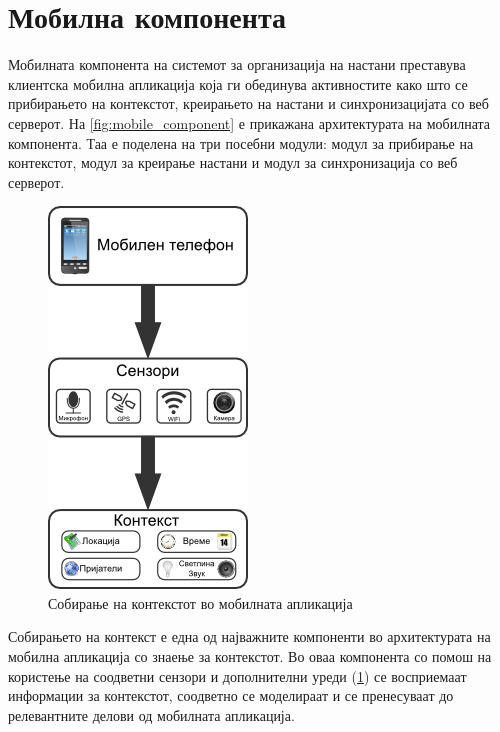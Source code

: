 \section{Мобилна компонента}

Мобилната компонента на системот за организација на настани преставува клиентска
мобилна апликација која ги обединува активностите како што се прибирањето на
контекстот, креирањето на настани и синхронизацијата со веб серверот. На
\ref{fig:mobile_component} е прикажана архитектурата на мобилната компонента.
Таа е поделена на три посебни модули: модул за прибирање на контекстот, модул за
креирање настани и модул за синхронизација со веб серверот.

\begin{figure}[htb]
\centering
\includegraphics[scale=0.4]{images/context_aquisition}
\caption{Собирање на контекстот во мобилната апликација}
\label{fig:context_aquisition}
\end{figure}

 
Собирањето на контекст е една од најважните компоненти во архитектурата на
мобилна апликација со знаење за контекстот. Во оваа компонента со помош на
користење на соодветни сензори и дополнителни уреди
(\ref{fig:context_aquisition}) се восприемаат информации за контекстот,
соодветно се моделираат и се пренесуваат до релевантните делови од мобилната
апликација.

